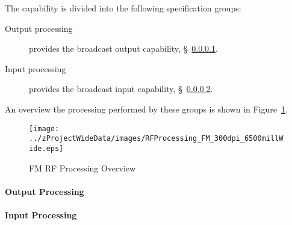 The \ThisSys \ThisSegment \FM capability is divided into the following specification groups:
\begin{description}
	\item[Output processing] provides the \FM broadcast output capability, \S~\ref{loc:RF_FM_Output}.
	\item[Input processing]  provides the \FM broadcast input  capability, \S~\ref{loc:RF_FM_Input}.
\end{description}
An overview the processing performed by these groups is shown in Figure~\ref{fig:FM_RF_Processing}.
\begin{figure}[htbp]
	\centering
		\texttt{[image: ../zProjectWideData/images/RFProcessing\_FM\_300dpi\_6500millWide.eps]}
	\caption[FM RF Processing Overview]{FM RF Processing Overview}
	\label{fig:FM_RF_Processing}
\end{figure}

\KNEADPARAGRAPHNEWPAGE
\paragraph{\FM \RF Output Processing}
\label{loc:RF_FM_Output}
\renewcommand{\ThisSubSegment}{\FM \RF Output Processing\xspace}%


\KNEADPARAGRAPHNEWPAGE
\paragraph{\FM \RF Input Processing}
\label{loc:RF_FM_Input}
\renewcommand{\ThisSubSegment}{\FM \RF Input Processing\xspace}%

